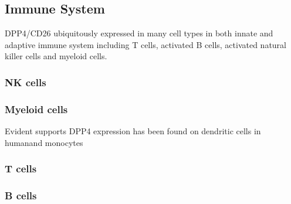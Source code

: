 \subsection{Immune System}
DPP4/CD26 ubiquitously expressed in many cell types in both innate and adaptive immune system including T cells, activated B cells, activated natural killer cells and myeloid cells.~\cite{Abbott1994,Shingu2003,Hong1989,Gutschmidt1981,Dikov2004,Bühling1995,Tanaka1992,Gorrell1991}  

\subsubsection{NK cells}

\subsubsection{Myeloid cells}
Evident supports DPP4 expression has been found on dendritic cells in humanand monocytes

\subsubsection{T cells}
\subsubsection{B cells}

